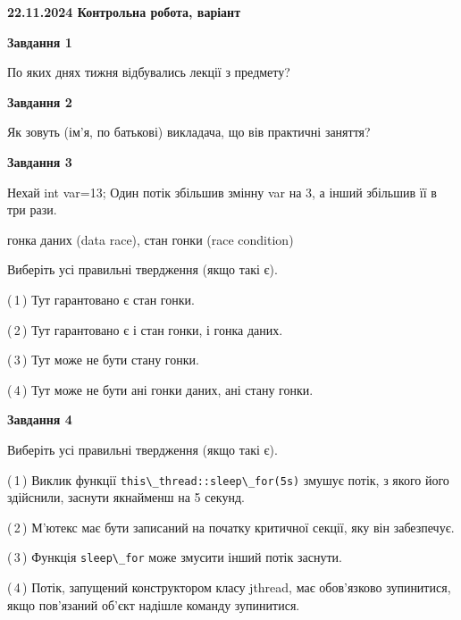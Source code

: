 \documentclass[12pt, ukrainian]{article}
\def\code#1{\Verb!#1!}
\begin{document}
\begin {large}

\textbf{22.11.2024 Контрольна робота, варіант  }\par


{

\begin{center}
\textbf{Завдання 1}
\end{center}

По яких днях тижня відбувались лекції з предмету?


\begin{center}
\textbf{Завдання 2}
\end{center}

Як зовуть (ім'я, по батькові) викладача, що вів практичні заняття?


\begin{center}
\textbf{Завдання 3}
\end{center}

Нехай int var=13; Один потік збільшив змінну var на 3, а інший збільшив її в три рази.

гонка даних (data race), стан гонки (race condition)

Виберіть усі правильні твердження (якщо такі є).\par
\vspace{2mm}
(\,1\,) Тут гарантовано є стан гонки.%

(\,2\,) Тут гарантовано є і стан гонки, і гонка даних.%

(\,3\,) Тут може не бути стану гонки.%

(\,4\,) Тут може не бути ані гонки даних, ані стану гонки.%


\begin{center}
\textbf{Завдання 4}
\end{center}

Виберіть усі правильні твердження (якщо такі є).\par
\vspace{2mm}

(\,1\,) Виклик функції \code{this\_thread::sleep\_for(5s)} змушує потік, з якого його здійснили, заснути якнайменш на 5 секунд.%

(\,2\,) М’ютекс має бути записаний на початку критичної секції, яку він забезпечує.%

(\,3\,) Функція \code{sleep\_for} може змусити інший потік заснути.%

(\,4\,) Потік, запущений конструктором класу jthread, має обов’язково зупинитися, якщо пов’язаний об’єкт надішле команду зупинитися.%


}
\end{large}
\end{document}

